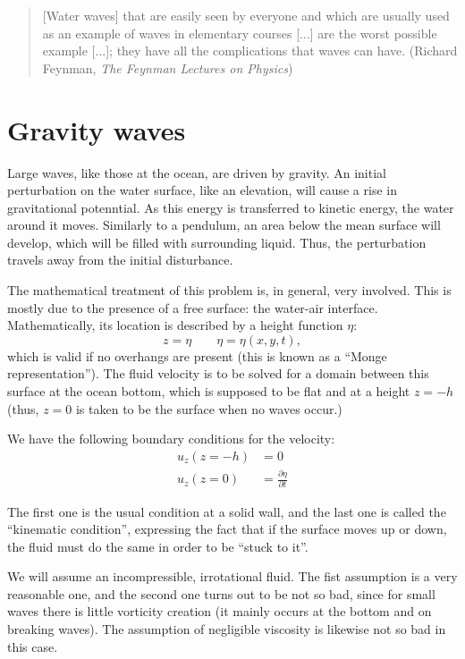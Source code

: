 \begin{quote}
[Water waves] that are easily seen by everyone and which are usually
used as an example of waves in elementary courses [...] are the worst
possible example [...]; they have all the complications that waves can
have. \hfill (Richard Feynman, \textit{The Feynman Lectures on Physics})
\end{quote}

\section{Gravity waves}

Large waves, like those at the ocean, are driven by gravity. An
initial perturbation on the water surface, like an elevation, will
cause a rise in gravitational potenntial. As this energy is
transferred to kinetic energy, the water around it moves. Similarly to
a pendulum, an area below the mean surface will develop, which will be
filled with surrounding liquid. Thus, the perturbation travels away
from the initial disturbance.

The mathematical treatment of this problem is, in general, very
involved. This is mostly due to the presence of a free surface: the
water-air interface. Mathematically, its location is described by a
height function $\eta$:
\begin{equation}
  \label{eq:waves_elevation}
  z=\eta  \qquad  \eta=\eta(x,y,t) ,
\end{equation}
which is valid if no overhangs are present (this is known as a ``Monge
representation''). The fluid velocity is to be solved for a domain
between this surface at the ocean bottom, which is supposed to be flat
and at a height $z=-h$ (thus, $z=0$ is taken to be the surface when no
waves occur.)

We have the following boundary conditions for the velocity:
\begin{align}
  \label{eq:waves_bc}
  u_z(z=-h) &= 0 \\
  \label{eq:waves_bc2}
  u_z(z=0) &=  \frac{\partial \eta}{\partial t}
\end{align}


The first one is the usual condition at a solid wall, and the last one
is called the ``kinematic condition'', expressing the fact that if the
surface moves up or down, the fluid must do the same in order to be
``stuck to it''.

We will assume an incompressible, irrotational fluid. The fist
assumption is a very reasonable one, and the second one turns out to
be not so bad, since for small waves there is little vorticity
creation (it mainly occurs at the bottom and on breaking waves).  The
assumption of negligible viscosity is likewise not so bad in this
case.



